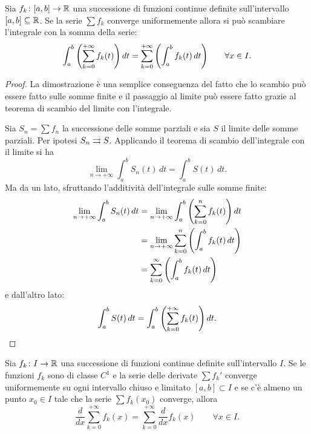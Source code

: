 \begin{theorem}
\label{th:integrale_serie}
\mymark{**}%
%
%
%
Sia $f_k\colon [a,b]\to\mathbb R$ una successione di funzioni continue definite sull'intervallo $[a,b]\subseteq \mathbb R$.
Se la serie $\sum f_k$ converge uniformemente
allora si può scambiare l'integrale con la somma della serie:
\[
  \int_a^b {\left( \sum_{k=0}^{+\infty} f_k(t) \right)}\, dt
  = \sum_{k=0}^{+\infty} {\left( \int_a^b f_k(t)\, dt \right)}
  \qquad \forall x \in I.
\]
\end{theorem}
\begin{proof}
\mymark{**}
La dimostrazione è una semplice conseguenza del fatto che lo scambio può essere fatto sulle somme finite e il passaggio al limite può essere fatto grazie al teorema di scambio del limite con l'integrale.

Sia $S_n = \sum f_n$ la successione delle somme parziali e sia $S$ il limite delle somme parziali. Per ipotesi $S_n\rightrightarrows S$. Applicando il teorema di scambio dell'integrale con il limite si ha
\[
  \lim_{n\to +\infty} \int_a^b S_n(t)\, dt = \int_a^b S(t)\, dt.
\]
Ma da un lato, sfruttando l'additività dell'integrale sulle somme finite:
\begin{align*}
  \lim_{n\to +\infty} \int_a^b S_n(t)\, dt
   &= \lim_{n\to+\infty}\int_a^b {\left( \sum_{k=0}^n f_k(t) \right)} \,  dt\\
   &= \lim_{n\to+\infty}\sum_{k=0}^n {\left( \int_a^b f_k(t)\, dt \right)}\\
   &= \sum_{k=0}^\infty {\left( \int_a^b f_k(t)\, dt \right)}
\end{align*}
e dall'altro lato:
\[
  \int_a^b S(t)\, dt = \int_a^b {\left( \sum_{k=0}^{+\infty} f_k(t) \right)}\, dt.
\]
\end{proof}

\begin{theorem}
\mymark{**}
Sia $f_k\colon I\to\mathbb R$ una successione di funzioni continue definite sull'intervallo $I$. Se le funzioni $f_k$ sono di classe $C^1$ e la serie delle derivate $\sum f_k'$ converge uniformemente
su ogni intervallo chiuso e limitato $[a,b]\subset I$
e se c'è almeno un punto $x_0\in I$ tale che la serie
$\sum f_k(x_0)$ converge, allora
\[
  \frac{d}{dx} \sum_{k=0}^{+\infty} f_k(x) = \sum_{k=0}^{+\infty} \frac{d}{dx}f_k(x)
  \qquad \forall x \in I.
\]
\end{theorem}

